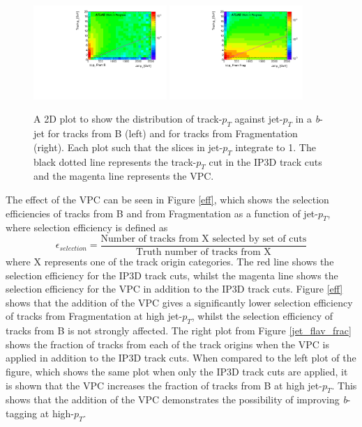 \documentclass[12pt, onecolumn,notitlepage]{article}
\begin{document}
\begin{figure}[!tb]
	 \includegraphics[width=0.45\textwidth]{plots/vpc/2D_B.pdf}
	 \includegraphics[width=0.45\textwidth]{plots/vpc/2D_Frag.pdf}
	 \caption{A 2D plot to show the distribution of track-$p_T$ against jet-$p_T$ in a \textit{b}-jet for tracks from B (left) and for tracks from Fragmentation (right).
         Each plot such that the slices in jet-$p_T$ integrate to 1.
         The black dotted line represents the track-$p_{T}$ cut in the IP3D track cuts and the magenta line represents the VPC.}
         \label{2D}
\end{figure}


The effect of the VPC can be seen in Figure \ref{eff}, which shows the selection efficiencies of tracks from B and from Fragmentation as a function of jet-$p_T$,
where selection efficiency is defined as 
\begin{equation}
\epsilon_{selection} = \frac{\text{Number of tracks from X selected by set of cuts}}{\text{Truth number of tracks from X}}
\end{equation} 
where X represents one of the track origin categories. 
The red line shows the selection efficiency for the IP3D track cuts, 
whilst the magenta line shows the selection efficiency for the VPC in addition to the IP3D track cuts.
Figure \ref{eff} shows that the addition of the VPC gives a significantly lower selection efficiency of tracks 
from Fragmentation at high jet-$p_T$, whilst the selection efficiency of tracks from B is not strongly affected.
The right plot from Figure \ref{jet_flav_frac} shows the fraction of tracks from each of the track origins when the 
VPC is applied in addition to the IP3D track cuts.
When compared to the left plot of the figure, which shows the same plot when only the IP3D track cuts are applied,
it is shown that the VPC increases the fraction of tracks from B at high jet-$p_T$. 
This shows that the addition of the VPC demonstrates the possibility of improving \textit{b}-tagging at high-$p_T$. \\
\end{document}
